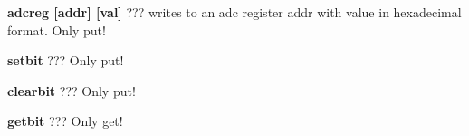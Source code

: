 \begin{DoxyItemize}
\item {\bfseries adcreg \mbox{[}addr\mbox{]} \mbox{[}val\mbox{]}} ??? writes to an adc register {\ttfamily addr} with {\ttfamily value} in hexadecimal format. Only put!
\end{DoxyItemize}


\begin{DoxyItemize}
\item {\bfseries setbit} ??? Only put!
\end{DoxyItemize}


\begin{DoxyItemize}
\item {\bfseries clearbit } ??? Only put!
\end{DoxyItemize}


\begin{DoxyItemize}
\item {\bfseries getbit } ??? Only get! 
\end{DoxyItemize}
